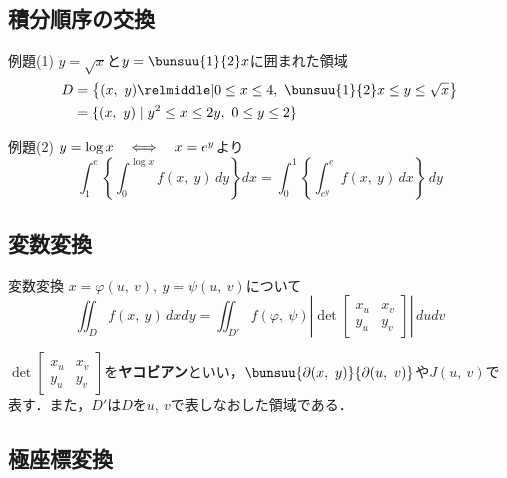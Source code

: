 \subsection{積分順序の交換}

\begin{tip}{例題(1)}
	$y = \sqrt{x}$と$y = \bunsuu{1}{2}x$に囲まれた領域
	\tcblower
	\begin{align*}
		D &= \left\{(x,\ y) \relmiddle| 0 \le x \le 4,\ \bunsuu{1}{2}x \le y \le \sqrt{x}\right\}\\
		&= \{(x,\ y) \mid y^2 \le x \le 2y,\ 0 \le y \le 2\}
	\end{align*}
\end{tip}

\begin{tip}{例題(2)}
	$y = \log x \quad\Longleftrightarrow\quad x = e^y$より
	\begin{equation*}
		\int_{1}^{e} \left\{\int_{0}^{\log x} f(x,\ y)\,dy\right\}dx = \int_{0}^{1} \left\{\int_{e^y}^{e} f(x,\ y)\,dx\right\}\,dy
	\end{equation*}
\end{tip}



\subsection{変数変換}

\begin{kousiki}{変数変換}
	$x = \varphi(u,\ v),\ y = \psi(u,\ v)$について
	\begin{equation}
		\iint_{D} f(x,\ y)\,dxdy = \iint_{D'} f(\varphi,\ \psi)\left|\det
			\begin{bmatrix}
				x_u & x_v\\ y_u & y_v
			\end{bmatrix}
		\right|\,dudv
	\end{equation}
\end{kousiki}

$\det\begin{bmatrix}
	x_u & x_v\\ y_u & y_v
\end{bmatrix}$を\textbf{ヤコビアン}といい，$\bunsuu{\partial(x,\ y)}{\partial(u,\ v)}$や$J(u,\ v)$で表す．また，$D'$は$D$を$u,\ v$で表しなおした領域である．



\subsection{極座標変換}

